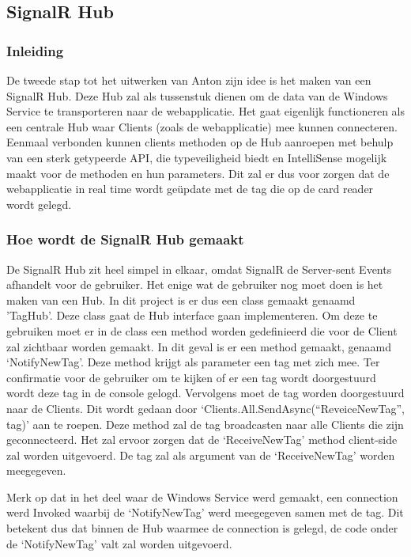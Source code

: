 \subsection{SignalR Hub}

\subsubsection{Inleiding}
De tweede stap tot het uitwerken van Anton zijn idee is het maken van een SignalR Hub. Deze Hub zal als tussenstuk dienen om de data van de Windows Service te transporteren naar de webapplicatie. Het gaat eigenlijk functioneren als een centrale Hub waar Clients (zoals de webapplicatie) mee kunnen connecteren. Eenmaal verbonden kunnen clients methoden op de Hub aanroepen met behulp van een sterk getypeerde API, die typeveiligheid biedt en IntelliSense mogelijk maakt voor de methoden en hun parameters. Dit zal er dus voor zorgen dat de webapplicatie in real time wordt geüpdate met de tag die op de card reader wordt gelegd. 

\subsubsection{Hoe wordt de SignalR Hub gemaakt}
De SignalR Hub zit heel simpel in elkaar, omdat SignalR de Server-sent Events afhandelt voor de gebruiker. Het enige wat de gebruiker nog moet doen is het maken van een Hub. In dit project is er dus een class gemaakt genaamd 'TagHub’. Deze class gaat de Hub interface gaan implementeren. Om deze te gebruiken moet er in de class een method worden gedefinieerd die voor de Client zal zichtbaar worden gemaakt. In dit geval is er een method gemaakt, genaamd ‘NotifyNewTag’. Deze method krijgt als parameter een tag met zich mee. Ter confirmatie voor de gebruiker om te kijken of er een tag wordt doorgestuurd wordt deze tag in de console gelogd. Vervolgens moet de tag worden doorgestuurd naar de Clients. Dit wordt gedaan door ‘Clients.All.SendAsync(“ReveiceNewTag”, tag)’ aan te roepen. Deze method zal de tag broadcasten naar alle Clients die zijn geconnecteerd. Het zal ervoor zorgen dat de ‘ReceiveNewTag’ method client-side zal worden uitgevoerd. De tag zal als argument van de ‘ReceiveNewTag’ worden meegegeven. 

Merk op dat in het deel waar de Windows Service werd gemaakt, een connection werd Invoked waarbij de ‘NotifyNewTag’ werd meegegeven samen met de tag. Dit betekent dus dat binnen de Hub waarmee de connection is gelegd, de code onder de ‘NotifyNewTag’ valt zal worden uitgevoerd.

